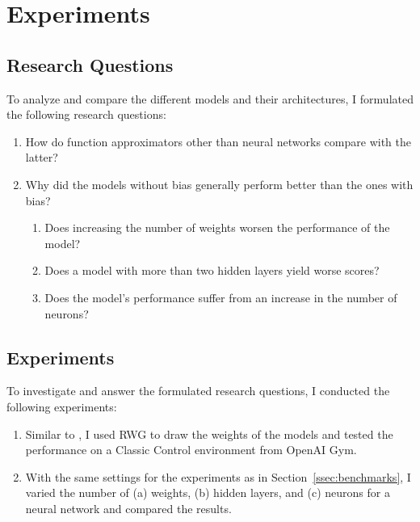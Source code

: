 
\chapter{Experiments}
\label{ch:experiments}

\section{Research Questions}
To analyze and compare the different models and their architectures, I formulated the following research questions:
\begin{enumerate}
  \item How do function approximators other than neural networks compare with the latter?
  \item Why did the models without bias generally perform better than the ones with bias?
  \begin{enumerate}
    \item Does increasing the number of weights worsen the performance of the model?
    \item Does a model with more than two hidden layers yield worse scores?
    \item Does the model's performance suffer from an increase in the number of neurons?
  \end{enumerate}
\end{enumerate}

\section{Experiments}
To investigate and answer the formulated research questions, I conducted the following experiments:
\begin{enumerate}
  \item Similar to \citet{oller_analyzing_2020}, I used RWG to draw the weights of the models and tested the performance on a Classic Control environment from OpenAI Gym.
  \item With the same settings for the experiments as in Section~\ref{ssec:benchmarks}, I varied the number of (a) weights, (b) hidden layers, and (c) neurons for a neural network and compared the results.
\end{enumerate}

